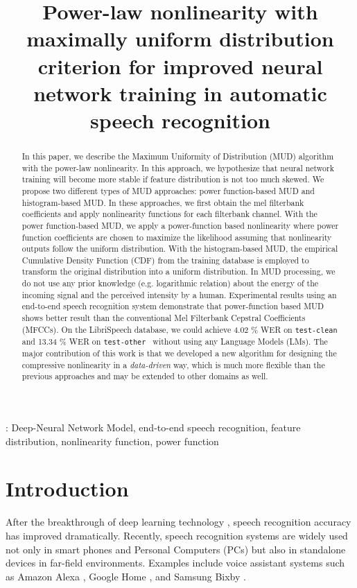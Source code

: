 \documentclass[a4paper]{article}
\title{Power-law nonlinearity with maximally uniform distribution criterion for
improved neural network training in automatic speech recognition}
\begin{document}
%
\maketitle
%
\begin{abstract}
In this paper, we describe the Maximum Uniformity of Distribution 
(MUD) algorithm with the power-law nonlinearity. In this approach, 
  we hypothesize that neural network training will become more stable
 if feature distribution is not too much skewed.
We propose two different types of MUD approaches: power function-based MUD 
and histogram-based MUD. In these approaches, we first obtain the mel filterbank
coefficients and apply nonlinearity functions for each filterbank channel.
With the power function-based MUD, we apply a power-function based
nonlinearity where power function coefficients are chosen to maximize the 
likelihood assuming that nonlinearity outputs follow the uniform distribution.
With the histogram-based MUD, the empirical Cumulative Density Function (CDF) 
from the training database is employed to transform the original distribution
 into a uniform distribution.
In MUD processing, we do not use any prior knowledge (e.g. logarithmic
relation) about the energy of the incoming signal and the perceived intensity 
by a human. Experimental results using an end-to-end speech recognition system
demonstrate that power-function based MUD shows better result than the 
 conventional Mel Filterbank Cepstral Coefficients (MFCCs).  On the LibriSpeech
  database, we could achieve 4.02 \% WER on {\tt test-clean} and 13.34 \% WER on
  {\tt test-other } without using any Language Models (LMs). The major
  contribution of this work is that we developed a new algorithm for designing
  the compressive nonlinearity in a {\it data-driven} way, which is much more
  flexible than the previous approaches and may be extended to other domains as
  well.
\end{abstract}
%

%
  :  Deep-Neural Network Model, end-to-end speech recognition, feature distribution,  nonlinearity function, power function



%
%
\section{Introduction}
After the breakthrough of deep learning technology
\cite{Seltzer2013DNNAurora4, Yu2013FeatureLearningDNN,
V_Vanhoucke_Deep_Learning_NIPS_Workshop_2011,
G_Hinton_IEEE_Signal_Process_Mag_2012, h_hadian_interspeech_2018_00, 
s_karita_interspeech_2019_00, c_chiu_icassp_2018_00, r_prabhavalkar_interspeech_2017_00}, 
speech recognition accuracy has
improved dramatically. Recently, speech recognition systems
are widely used not only in smart phones and Personal Computers
(PCs) but also in standalone devices in far-field environments.
Examples include voice assistant systems such as Amazon Alexa
, Google Home \cite{c_kim_interspeech_2017_00, B_Li_INTERSPEECH_2017_1}, and
Samsung Bixby \cite{samsung_bixby}.
\end{document}
